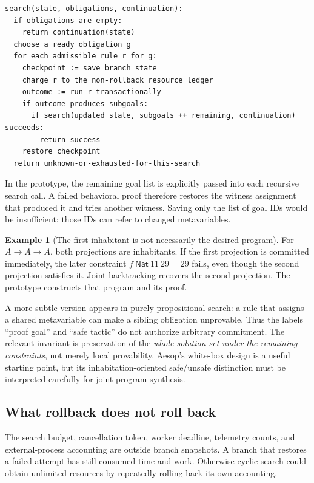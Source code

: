 \documentclass[11pt,letterpaper]{article}
\theoremstyle{definition}\newtheorem{definition}[theorem]{Definition}
\newtheorem{example}[theorem]{Example}
\theoremstyle{remark}\newtheorem{remark}[theorem]{Remark}
\begin{document}
\begin{lstlisting}[language={}]
search(state, obligations, continuation):
  if obligations are empty:
    return continuation(state)
  choose a ready obligation g
  for each admissible rule r for g:
    checkpoint := save branch state
    charge r to the non-rollback resource ledger
    outcome := run r transactionally
    if outcome produces subgoals:
      if search(updated state, subgoals ++ remaining, continuation) succeeds:
        return success
    restore checkpoint
  return unknown-or-exhausted-for-this-search
\end{lstlisting}

In the prototype, the remaining goal list is explicitly passed into each recursive
search call. A failed behavioral proof therefore restores the witness assignment
that produced it and tries another witness. Saving only the list of goal IDs
would be insufficient: those IDs can refer to changed metavariables.

\begin{example}[The first inhabitant is not necessarily the desired program]
For $A\to A\to A$, both projections are inhabitants. If the first projection is
committed immediately, the later constraint $f\ \mathsf{Nat}\ 11\ 29=29$ fails,
even though the second projection satisfies it. Joint backtracking recovers the
second projection. The prototype constructs that program and its proof.
\end{example}

A more subtle version appears in purely propositional search: a rule that assigns
a shared metavariable can make a sibling obligation unprovable. Thus the labels
``proof goal'' and ``safe tactic'' do not authorize arbitrary commitment. The
relevant invariant is preservation of the \emph{whole solution set under the
remaining constraints}, not merely local provability. Aesop's white-box design
is a useful starting point, but its inhabitation-oriented safe/unsafe distinction
must be interpreted carefully for joint program synthesis.\cite{aesop}

\subsection{What rollback does not roll back}

The search budget, cancellation token, worker deadline, telemetry counts, and
external-process accounting are outside branch snapshots. A branch that restores
a failed attempt has still consumed time and work. Otherwise cyclic search could
obtain unlimited resources by repeatedly rolling back its own accounting.
\end{document}
